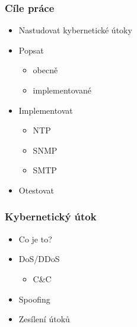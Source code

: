 \documentclass[%
  12pt,       				%
	t,                  %
	aspectratio=1610,   %
	unicode,						%
czech,              %
]{beamer}				    	%
\begin{document}
\vypninavigacnisymboly

\vytvortitulku

\begin{frame} 
	\frametitle{Cíle práce}
	\begin{itemize}
			\item Nastudovat kybernetické útoky
			\item Popsat
				\begin{itemize}
					\item obecně
					\item implementované
				\end{itemize}
			\item Implementovat
				\begin{itemize}
					\item NTP
					\item SNMP
					\item SMTP
				\end{itemize}
			\item Otestovat
	\end{itemize}
\end{frame}

\begin{frame} 
	\frametitle{Kybernetický útok}
	\begin{itemize}
		\item Co je to?
		\item DoS/DDoS
			\begin{itemize}
				\item C\&C
			\end{itemize}
		\item Spoofing
		\item Zesílení útoků
	\end{itemize}

%
%
\end{frame} 
\end{document}
